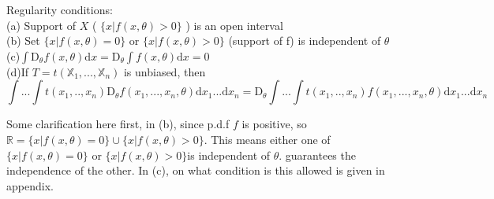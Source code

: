 Regularity conditions:\\
(a) Support of $X$ ( $\{ x | f(x, \theta) > 0 \}$ ) is an open interval\\
(b) Set $\{ x | f(x, \theta) = 0 \}$ or $\{ x | f(x, \theta) > 0 \}$ (support of f) is independent of $\theta$\\
(c)$\int \mathrm{D}_\theta f(x, \theta) \mathrm{d}x = \mathrm{D}_\theta \int f(x, \theta) \mathrm{d}x = 0$\\
(d)If $T = t(\mathbb{X}_1, ..., \mathbb{X}_n)$ is unbiased, then
$$\int ... \int t(x_1, .., x_n) \mathrm{D}_\theta f(x_1, ..., x_n, \theta) \mathrm{d}x_1...\mathrm{d}x_n = \mathrm{D}_\theta  \int ... \int t(x_1, .., x_n) f(x_1, ..., x_n, \theta) \mathrm{d}x_1...\mathrm{d}x_n $$ 

Some clarification here first, in (b), since p.d.f $f$ is positive, so $ \mathbb{R} = \{ x | f(x, \theta) = 0 \} \cup \{ x | f(x, \theta) > 0 \}$. This means either one of $\{ x | f(x, \theta) = 0 \}$ or $\{ x | f(x, \theta) > 0 \}$is independent of $\theta$.
 guarantees the independence of the other. In (c), on what condition is this allowed is given in appendix. \\
 
